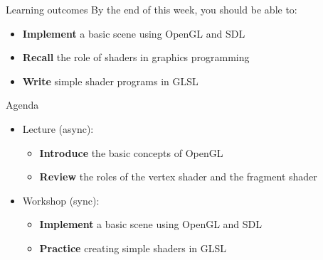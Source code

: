 \begin{frame}{Learning outcomes}
	By the end of this week, you should be able to:
	\begin{itemize}
		\item \textbf{Implement} a basic scene using OpenGL and SDL
		\item \textbf{Recall} the role of shaders in graphics programming
		\item \textbf{Write} simple shader programs in GLSL
	\end{itemize}
\end{frame}

\begin{frame}{Agenda}
	\begin{itemize}
		\pause\item Lecture (async):
		\begin{itemize}
			\item \textbf{Introduce} the basic concepts of OpenGL
			\item \textbf{Review} the roles of the vertex shader and the fragment shader
		\end{itemize}
		\pause\item Workshop (sync):
		\begin{itemize}
			\item \textbf{Implement} a basic scene using OpenGL and SDL
			\item \textbf{Practice} creating simple shaders in GLSL
		\end{itemize}
	\end{itemize}
\end{frame}